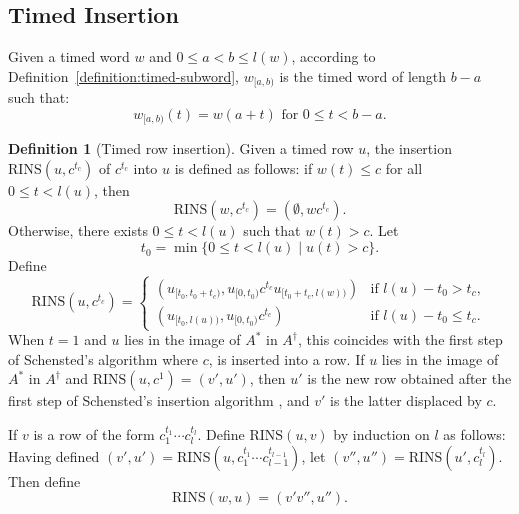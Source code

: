 \documentclass[10pt]{amsproc}
\theoremstyle{definition}
\newtheorem{definition}[theorem]{Definition}
\theoremstyle{remark}
\newcommand{\rowins}{\mathrm{RINS}}
\begin{document}
\subsection{Timed Insertion}
\label{sec:timed-insertion}
Given a timed word $w$ and $0\leq a < b \leq l(w)$, according to Definition~\ref{definition:timed-subword}, $w_{[a, b)}$ is the timed word of length $b-a$ such that:
\begin{displaymath}
  w_{[a, b)}(t) = w(a+ t) \text{ for } 0\leq t<b-a.
\end{displaymath}
\begin{definition}[Timed row insertion]
  \label{definition:timed-row-insertion}
  Given a timed row $u$, the insertion $\rowins(u, c^{t_c})$ of $c^{t_c}$ into $u$ is defined as follows:
  if $w(t)\leq c$ for all $0\leq t < l(u)$, then
  \begin{displaymath}
    \rowins(w, c^{t_c}) = (\emptyset, wc^{t_c}).
  \end{displaymath}
  Otherwise, there exists $0\leq t < l(u)$ such that $w(t)>c$.
  Let
  \begin{displaymath}
    t_0 = \min\{0\leq t< l(u) \mid u(t)> c\}.
  \end{displaymath}
  Define
  \begin{displaymath}
    \rowins(u, c^{t_c}) =
    \begin{cases}
      (u_{[t_0, t_0+t_c)}, u_{[0, t_0)}c^{t_c} u_{[t_0+t_c, l(w))}) & \text{if } l(u) - t_0 > t_c,\\
      (u_{[t_0, l(u))}, u_{[0, t_0)} c^{t_c}) & \text{if } l(u) - t_0 \leq t_c.
    \end{cases}
  \end{displaymath}
  When $t=1$ and $u$ lies in the image of $A^*$ in $A^\dagger$, this coincides with the first step of Schensted's algorithm  where $c$, is inserted into a row.
  If $u$ lies in the image of $A^*$ in $A^\dagger$ and $\rowins(u,c^1)=(v',u')$, then $u'$ is the new row obtained after the first step of Schensted's insertion algorithm \cite[p.~180]{schensted}, and $v'$ is the latter displaced by $c$.

  If $v$ is a row of the form $c_1^{t_1}\dotsb c_l^{t_l}$.
  Define $\rowins(u,v)$ by induction on $l$ as follows:
  Having defined $(v',u')=\rowins(u,c_1^{t_1}\dotsb c_{l-1}^{t_{l-1}})$,
  let $(v'', u'')=\rowins(u',c_l^{t_l})$.
  Then define
  \begin{displaymath}
    \rowins(w,u) = (v'v'', u'').
  \end{displaymath}
\end{definition}
\end{document}
